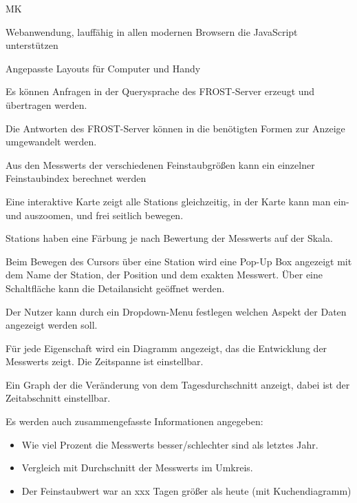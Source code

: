 \begin{Kriterien}{MK}

	\item Webanwendung, lauffähig in allen modernen Browsern die JavaScript unterstützen

	\item Angepasste Layouts für Computer und \gls{Handy}
	
	\item Es können Anfragen in der Querysprache des \gls{FROST-Server} erzeugt und übertragen werden.
	
	\item Die Antworten des \gls{FROST-Server} können in die benötigten Formen zur Anzeige umgewandelt werden.
	
	\item Aus den \glspl{Messwert} der verschiedenen Feinstaubgrößen kann ein einzelner \gls{Feinstaubindex} berechnet werden

	\item Eine interaktive Karte zeigt alle \glspl{Station} gleichzeitig, in der Karte kann man ein- und auszoomen, und frei seitlich bewegen.

	\item \glspl{Station} haben eine Färbung je nach Bewertung der \glspl{Messwert} auf der Skala.
	
	\item Beim Bewegen des Cursors über eine \gls{Station} wird eine \gls{Pop-Up} Box angezeigt mit dem Name der Station, der Position und dem exakten Messwert.
		Über eine Schaltfläche kann die Detailansicht geöffnet werden.
	
	\item Der Nutzer kann durch ein \gls{Dropdown-Menu} festlegen welchen Aspekt der Daten angezeigt werden soll. 
	
	\item Für jede Eigenschaft wird ein Diagramm angezeigt, das die Entwicklung der \glspl{Messwert} zeigt. Die Zeitspanne ist einstellbar.
	
	\item Ein \gls{Graph} der die Veränderung von dem Tagesdurchschnitt anzeigt, dabei ist der Zeitabschnitt einstellbar.
	
	\item Es werden auch zusammengefasste Informationen angegeben: 
\end{Kriterien}
		
\begin{itemize}
	\item Wie viel Prozent die \glspl{Messwert} besser/schlechter sind als letztes Jahr.
    \item Vergleich mit Durchschnitt der \glspl{Messwert} im Umkreis.
    \item Der Feinstaubwert war an xxx Tagen größer als heute (mit \gls{Kuchendiagramm})
\end{itemize}

